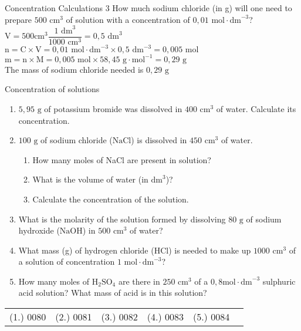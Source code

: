       \begin{wex}{Concentration Calculations 3 }
{
\label{m38712*id283476}How much sodium chloride (in g) will one need to prepare $500 {\text{ cm}}^{3}$ of solution with a concentration of $0,01 \text{ mol} \cdot \text{dm}^{-3}$?
   }
{
$\text{V}= 500 \text{cm}^{3} \dfrac{1 \text{ dm}^{3}}{1 000 \text{ cm}^{3}}=0,5 {\text{ dm}}^{3}$
$\text{n}=\text{C} \times \text{V}= 0,01 \text{ mol} \cdot \text{dm}^{-3} \times 0,5 \text{ dm}^{-3} = 0,005 \text{ mol}$
$\text{m}=\text{n} \times \text{M}= 0,005 \text{ mol} \times 58,45 \text{ g} \cdot \text{mol}^{-1} = 0,29 \text{ g}$\\
The mass of sodium chloride needed is $0,29 \text{ g}$ 
}
    \end{wex}
    \noindent
\label{m38712*secfhsst!!!underscore!!!id1879}
            \begin{exercises}{ Concentration of solutions
      }
            \nopagebreak \noindent
      \label{m38712*id283713}\begin{enumerate}[noitemsep, label=\textbf{\arabic*}. ] 
\item $5,95 \text{ g}$ of potassium bromide was dissolved in $400 {\text{ cm}}^{3}$ of water. Calculate its concentration.
\item $100 \text{ g}$ of sodium chloride ($\text{NaCl}$) is dissolved in $450 {\text{ cm}}^{3}$ of water.
  \begin{enumerate}[noitemsep, label=\textbf{\alph*}. ] 
    \item How many moles of NaCl are present in solution?
    \item What is the volume of water (in ${\text{dm}}^{3}$)?
    \item Calculate the concentration of the solution.
\end{enumerate}
\item What is the molarity of the solution formed by dissolving $80 \text{ g}$ of sodium hydroxide ($\text{NaOH}$) in $500 {\text{ cm}}^{3}$ of water? 
\item What mass (g) of hydrogen chloride ($\text{HCl}$) is needed to make up $1000 {\text{ cm}}^{3}$ of a solution of concentration $1 \text{ mol} \cdot {\text{dm}}^{-3}$?
\item How many moles of $\text{H}{}_{2}\text{SO}{}_{4}$ are there in $250 {\text{ cm}}^{3}$ of a $0,8 \text{mol} \cdot \text{dm}^{-3}$ sulphuric acid solution? What mass of acid is in this solution?
\end{enumerate}
\practiceinfo
\par 
 \par \begin{tabular}[h]{cccccc}
 (1.) 0080  &  (2.) 0081  &  (3.) 0082  &  (4.) 0083  &  (5.) 0084  & \end{tabular}
\end{exercises}
